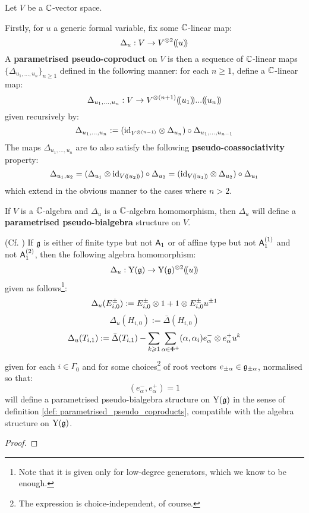             \begin{definition} \label{def: parametrised_pseudo_coproducts}
                Let $V$ be a $\mathbb{C}$-vector space. 

                Firstly, for $u$ a generic formal variable, fix some $\mathbb{C}$-linear map:
                    $$\Delta_u: V \to V^{\tensor 2}(\!(u)\!)$$
                A \textbf{parametrised pseudo-coproduct} on $V$ is then a sequence of $\mathbb{C}$-linear maps $\{\Delta_{u_1, ..., u_n}\}_{n \geq 1}$ defined in the following manner: for each $n \geq 1$, define a $\mathbb{C}$-linear map:
                    $$\Delta_{u_1, ..., u_n}: V \to V^{\tensor (n + 1)}(\!(u_1)\!) ... (\!(u_n)\!)$$
                given recursively by:
                    $$\Delta_{u_1, ..., u_n} := ( \id_{ V^{\tensor (n - 1)} } \tensor \Delta_{u_n} ) \circ \Delta_{u_1, ..., u_{n - 1}}$$
                The maps $\Delta_{u_1, ..., u_n}$ are to also satisfy the following \textbf{pseudo-coassociativity} property:
                    $$\Delta_{u_1, u_2} = ( \Delta_{u_1} \tensor \id_{V(\!(u_2)\!)} ) \circ \Delta_{u_2} = ( \id_{V(\!(u_1)\!)} \tensor \Delta_{u_2} ) \circ \Delta_{u_1}$$
                which extend in the obvious manner to the cases where $n > 2$. 

                If $V$ is a $\mathbb{C}$-algebra and $\Delta_u$ is a $\mathbb{C}$-algebra homomorphism, then $\Delta_u$ will define a \textbf{parametrised pseudo-bialgebra} structure on $V$.
            \end{definition}
            \begin{theorem} \label{theorem: parametrised_pseudo_coproduct_on_yangians}
                (Cf. \cite[Theorem 6.2]{guay_nakajima_wendlandt_affine_yangian_coproduct}) If $\mathfrak{g}$ is either of finite type but not $\mathsf{A}_1$ or of affine type but not $\mathsf{A}_1^{(1)}$ and not $\mathsf{A}_1^{(2)}$, then the following algebra homomorphism:
                    $$\Delta_u: \rmY(\g) \to \rmY(\g)^{\tensor 2}(\!(u)\!)$$
                given as follows\footnote{Note that it is given only for low-degree generators, which we know to be enough.}:
                    $$\Delta_u(E_{i, 0}^{\pm}) := E_{i, 0}^{\pm} \tensor 1 + 1 \tensor E_{i, 0}^{\pm} u^{\pm 1}$$
                    $$\Delta_u(H_{i, 0}) := \bar{\Delta}(H_{i, 0})$$
                    $$\Delta_u(T_{i, 1}) := \bar{\Delta}(T_{i, 1}) - \sum_{k \geq 1} \sum_{\alpha \in \Phi^+} (\alpha, \alpha_i) e_{\alpha}^- \tensor e_{\alpha}^+ u^k$$
                given for each $i \in \Gamma_0$ and for some choices\footnote{The expression is choice-independent, of course.} of root vectors $e_{\pm\alpha} \in \mathfrak{g}_{\pm\alpha}$, normalised so that:
                    $$(e_{\alpha}^-, e_{\alpha}^+) = 1$$
                will define a parametrised pseudo-bialgebra structure on $\mathrm{Y}(\mathfrak{g})$ in the sense of definition \ref{def: parametrised_pseudo_coproducts}, compatible with the algebra structure on $\mathrm{Y}(\mathfrak{g})$.
            \end{theorem}
                \begin{proof}
                    
                \end{proof}

